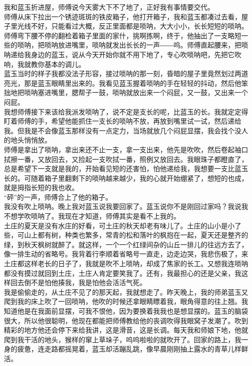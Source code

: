 我和蓝玉折进屋，师傅说今天雾大下不了地了，正好我有事情要交代。
\\

师傅从床下拉出一个锈迹斑斑的铁皮箱子，他打开箱子，我和蓝玉都凑过去看，屋子里光线不好，只能看过大概，反正里面都是唢呐，大大小小，长长短短的唢呐。师傅弯下腰不停的翻检着箱子里面的家什，挑啊拣啊，终于，他抽出了一支略短一些的唢呐，把唢呐放进嘴里，唢呐就发出长长的一声――呜。师傅直起腰来，把唢呐递给我身边的蓝玉，说从今天开始你就不用下地了，专心吹唢呐吧，先把它吹响，我就教你基本的调儿。
\\

蓝玉当时的样子我都没法子形容，接过唢呐的那一刻，昏暗的屋子里竟然划过两道亮光，那是蓝玉眼睛里出来的。我看见蓝玉握着唢呐的手在轻轻的抖动，然后他笨拙地把唢呐塞进嘴里，腮帮子一鼓，唢呐就放出来一个闷屁，又一鼓，又出来一个闷屁。
\\

我想师傅接下来该给我派发唢呐了，说不定是支长的呢，比蓝玉的长。我就定定得盯着师傅的手，希望他能抓住一支长的唢呐不放，再放到嘴里试一试，然后递给我。但我是不会像蓝玉那样没有一点定力，当场就放几个闷屁显摆，我会找个没人的地头悄悄放。
\\

师傅是拿出了唢呐，拿出来还不止一支，拿一支出来，他先是吹吹，然后卷起袖口拭擦一番，又放回去，又捡起一支吹拭一番，照例又放回去。我眼珠子都瞪直了，总是希望下一支就是我的，开始看见短的还害怕，怕他递给我，我想要一支比蓝玉长的。可随着箱子里翻剩下的唢呐越来越少，我的心就开始绷紧了，想短的也成，就是拇指长短的我也收。
\\

“砰”的一声，师傅合上了他的箱子。
\\

我没有吹上唢呐。晚上我对蓝玉说我要回家了。蓝玉说你不是刚回过家吗？我说我不想学吹唢呐了。我现在才知道，师傅其实是看不上我的。
\\

土庄的夏天是没有水庄的好看，可土庄的秋天却老有味儿了。土庄的山小是小了些，可山上都有树，种类也繁多，常青的松和落叶的枫抱在一起，夏天还是整齐的绿，到秋天枫树就醉了。就这样，一个一个红绿间杂的山丘一排儿的往远方去了，像一排生动的省略号。我背着行李顺着省略号一直走，边走边哭，我悲伤极了，来土庄都这样老长的日子了，我就是吹不上唢呐，却成了焦家的长工。又想我连唢呐都没有摸过就回到土庄，土庄人肯定要笑我了。还有，我最担心的还是父亲，我这样回去倒不是怕他揍我，我是怕他会活活气死。
\\

我是偷偷走的，从土庄不见了的那天起，我就想走了。昨天晚上，我的师弟蓝玉又爬到我的床上吹了一回唢呐，他吹的时候还拿眼睛瞟着我，眼角得意的往上翘。我知道他是在我面前显摆，可我不恨他，因为要换着我我也是想显摆的。蓝玉的脑袋很大，所以他很聪明，他现在都能把师傅教给他的丧调吹得我眼窝子发潮了。吹到精彩的地方他还会停下来给我讲，这是滑音，这是长调。每天我和师娘下地，他就爬到我干活的地头，猴样的窜上草垛子，呜呜啦啦的就吹开了。回家的路上，我一身的疲惫，连走路都摇晃着，蓝玉却活蹦乱跳，像早晨刚刚抽上露水的青草儿样鲜活。
\\

